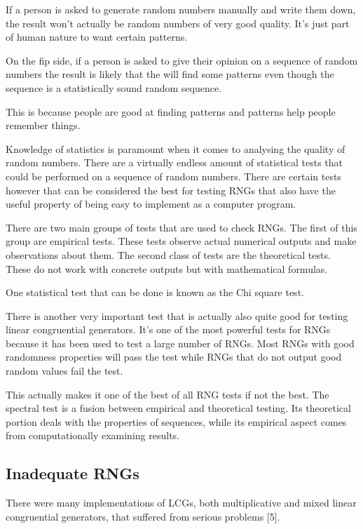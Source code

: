 \documentclass{article}
\begin{document}
    If a person is asked to generate random numbers manually and write them down,
    the result won't actually be random numbers of very good quality.
    It's just part of human nature to want certain patterns.

    On the fip side, if a person is asked to give their opinion on
    a sequence of random numbers the result is likely that the will find some patterns
    even though the sequence is a statistically sound random sequence.

    This is because people are good at finding patterns and patterns help people remember
    things.

    Knowledge of statistics is paramount when it comes to analysing the quality
    of random numbers. There are a virtually endless amount of statistical tests
    that could be performed on a sequence of random numbers.
    There are certain tests however that can be considered the best for testing RNGs
    that also have the useful property of being easy to implement as a computer program.

    There are two main groups of tests that are used to check RNGs.
    The first of this group are empirical tests. These tests observe
    actual numerical outputs and make observations about them.
    The second class of tests are the theoretical tests.
    These do not work with concrete outputs but with mathematical formulas.

    One statistical test that can be done is known as the Chi square test.

    There is another very important test that is actually also quite good
    for testing linear congruential generators. It's one of the most powerful
    tests for RNGs because it has been used to test a large number of
    RNGs. Most RNGs with good randomness properties will pass the test while
    RNGs that do not output good random values fail the test.

    This actually makes it one of the best of all RNG tests if not the best.
    The spectral test is a fusion between empirical and theoretical testing.
    Its theoretical portion deals with the properties of sequences,
    while its empirical aspect comes from computationally examining results.

    \subsection{Inadequate RNGs}

    There were many implementations of LCGs, both multiplicative and
    mixed linear congruential generators, that suffered from serious problems [5].
\end{document}
